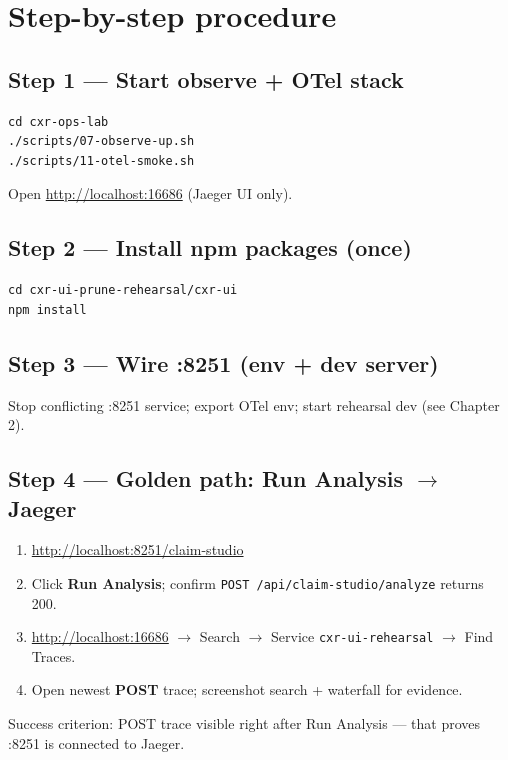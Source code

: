 \documentclass[11pt,a4paper]{report}
\begin{document}
\chapter{Step-by-step procedure}

\section{Step 1 --- Start observe + OTel stack}
\begin{lstlisting}[style=bash]
cd cxr-ops-lab
./scripts/07-observe-up.sh
./scripts/11-otel-smoke.sh
\end{lstlisting}
Open \url{http://localhost:16686} (Jaeger UI only).

\section{Step 2 --- Install npm packages (once)}
\begin{lstlisting}[style=bash]
cd cxr-ui-prune-rehearsal/cxr-ui
npm install
\end{lstlisting}

\section{Step 3 --- Wire :8251 (env + dev server)}
Stop conflicting :8251 service; export OTel env; start rehearsal dev (see Chapter 2).

\section{Step 4 --- Golden path: Run Analysis $\rightarrow$ Jaeger}
\begin{enumerate}
  \item \url{http://localhost:8251/claim-studio}
  \item Click \textbf{Run Analysis}; confirm \texttt{POST /api/claim-studio/analyze} returns 200.
  \item \url{http://localhost:16686} $\rightarrow$ Search $\rightarrow$ Service \texttt{cxr-ui-rehearsal} $\rightarrow$ Find Traces.
  \item Open newest \textbf{POST} trace; screenshot search + waterfall for evidence.
\end{enumerate}
Success criterion: POST trace visible right after Run Analysis --- that proves :8251 is connected to Jaeger.
\end{document}
